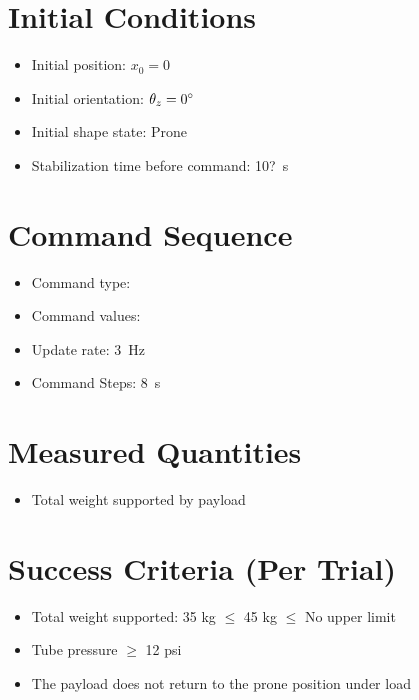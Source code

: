 \documentclass[11pt]{article}
\begin{document}
\section*{Initial Conditions}
\begin{itemize}[noitemsep]
    \item Initial position: $x_0 = 0$
    \item Initial orientation: $\theta_z = 0 {\degree}$
    \item Initial shape state: Prone
    \item Stabilization time before command: 10?~s
\end{itemize}

\section*{Command Sequence}
\begin{itemize}[noitemsep]
    \item Command type: \underline{\hspace{5 cm}}
    \item Command values: \underline{\hspace{5 cm}}
    \item Update rate: 3~Hz
    \item Command Steps: 8~s
\end{itemize}

\section*{Measured Quantities}
\begin{itemize}[noitemsep]
    \item Total weight supported by payload
\end{itemize}

\section*{Success Criteria (Per Trial)}
\begin{itemize}[noitemsep]
    \item Total weight supported: 35 kg  $\leq$ 45 kg $\leq$ No upper limit 
    \item Tube pressure $\geq$ 12 psi
    \item The payload does not return to the prone position under load
\end{itemize}
\end{document}
